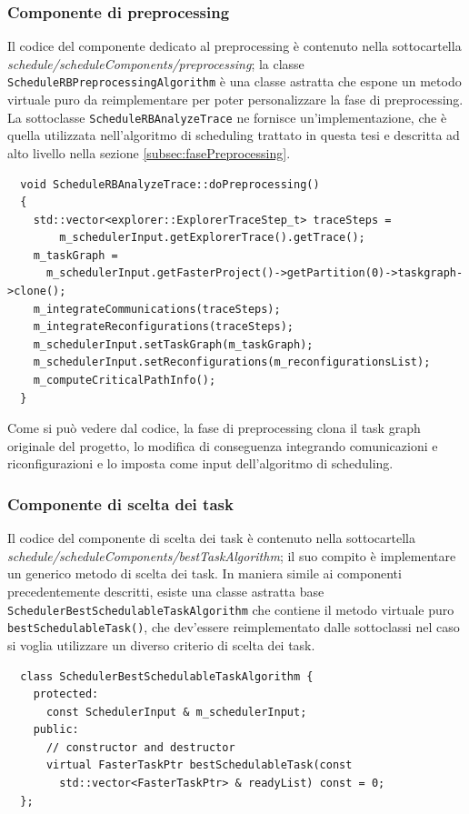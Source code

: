 \subsubsection{Componente di preprocessing}
Il codice del componente dedicato al preprocessing è contenuto nella 
sottocartella \emph{schedule/scheduleComponents/preprocessing}; la classe 
\verb+ScheduleRBPreprocessingAlgorithm+ è una classe astratta che espone un 
metodo virtuale puro da reimplementare per poter personalizzare la fase di 
preprocessing. La sottoclasse \verb+ScheduleRBAnalyzeTrace+ ne fornisce 
un'implementazione, che è quella utilizzata nell'algoritmo di scheduling 
trattato in questa tesi e descritta ad alto livello nella sezione 
\ref{subsec:fasePreprocessing}.
\newline
\begin{verbatim}
  void ScheduleRBAnalyzeTrace::doPreprocessing()
  {
    std::vector<explorer::ExplorerTraceStep_t> traceSteps = 
        m_schedulerInput.getExplorerTrace().getTrace();
    m_taskGraph = 
      m_schedulerInput.getFasterProject()->getPartition(0)->taskgraph->clone();
    m_integrateCommunications(traceSteps);
    m_integrateReconfigurations(traceSteps);
    m_schedulerInput.setTaskGraph(m_taskGraph);
    m_schedulerInput.setReconfigurations(m_reconfigurationsList);
    m_computeCriticalPathInfo();
  }
\end{verbatim}

Come si può vedere dal codice, la fase di preprocessing clona il task graph 
originale del progetto, lo modifica di conseguenza integrando comunicazioni e 
riconfigurazioni e lo imposta come input dell'algoritmo di scheduling.

\subsubsection{Componente di scelta dei task}
Il codice del componente di scelta dei task è contenuto nella sottocartella 
\emph{schedule/scheduleComponents/bestTaskAlgorithm}; il suo compito è 
implementare un generico metodo di scelta dei task. In maniera simile ai 
componenti precedentemente descritti, esiste una classe astratta base 
\verb+SchedulerBestSchedulableTaskAlgorithm+ che contiene il metodo virtuale 
puro \verb+bestSchedulableTask()+, che dev'essere reimplementato dalle 
sottoclassi nel caso si voglia utilizzare un diverso criterio di scelta dei 
task.
\newline
\begin{verbatim}
  class SchedulerBestSchedulableTaskAlgorithm {
    protected:
      const SchedulerInput & m_schedulerInput;
    public:
      // constructor and destructor
      virtual FasterTaskPtr bestSchedulableTask(const 
        std::vector<FasterTaskPtr> & readyList) const = 0;
  };
\end{verbatim}

